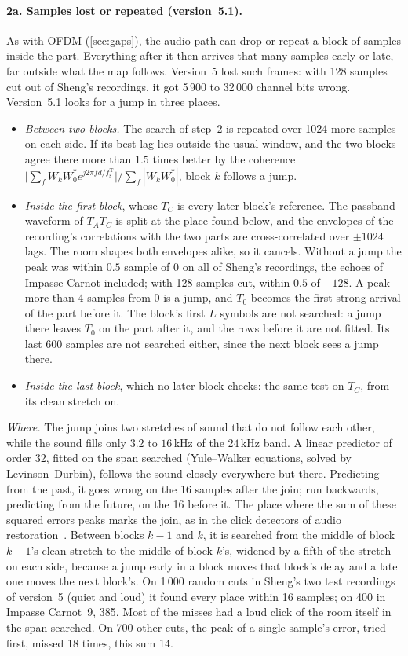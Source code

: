 \documentclass[11pt,a4paper]{article}
\newcommand{\kHz}{\,\mathrm{kHz}}
\newcommand{\fsT}{f_{\mathrm{s}}^{\mathrm{T}}}
\theoremstyle{remark}
\begin{document}
\paragraph{2a. Samples lost or repeated (version~5.1).}
As with OFDM (\cref{sec:gaps}), the audio path can drop or repeat a block of samples inside the part. Everything after it then arrives that many samples early or late, far outside what the map follows. Version~5 lost such frames: with 128 samples cut out of Sheng's recordings, it got 5\,900 to 32\,000 channel bits wrong. Version~5.1 looks for a jump in three places.
\begin{itemize}
\item \emph{Between two blocks.} The search of step~2 is repeated over 1024 more samples on each side. If its best lag lies outside the usual window, and the two blocks agree there more than $1.5$ times better by the coherence $\bigl|\sum_f W_k W_0^* e^{j2\pi f d/\fsT}\bigr| / \sum_f |W_k W_0^*|$, block $k$ follows a jump.
\item \emph{Inside the first block}, whose $T_C$ is every later block's reference. The passband waveform of $T_A T_C$ is split at the place found below, and the envelopes of the recording's correlations with the two parts are cross-correlated over $\pm 1024$ lags. The room shapes both envelopes alike, so it cancels. Without a jump the peak was within $0.5$ sample of 0 on all of Sheng's recordings, the echoes of Impasse Carnot included; with 128 samples cut, within $0.5$ of $-128$. A peak more than 4 samples from 0 is a jump, and $T_0$ becomes the first strong arrival of the part before it. The block's first $L$ symbols are not searched: a jump there leaves $T_0$ on the part after it, and the rows before it are not fitted. Its last 600 samples are not searched either, since the next block sees a jump there.
\item \emph{Inside the last block}, which no later block checks: the same test on $T_C$, from its clean stretch on.
\end{itemize}
\emph{Where.} The jump joins two stretches of sound that do not follow each other, while the sound fills only $3.2$ to $16\kHz$ of the $24\kHz$ band. A linear predictor of order 32, fitted on the span searched (Yule--Walker equations, solved by Levinson--Durbin), follows the sound closely everywhere but there. Predicting from the past, it goes wrong on the 16 samples after the join; run backwards, predicting from the future, on the 16 before it. The place where the sum of these squared errors peaks marks the join, as in the click detectors of audio restoration~\cite{godsill}. Between blocks $k-1$ and $k$, it is searched from the middle of block $k-1$'s clean stretch to the middle of block $k$'s, widened by a fifth of the stretch on each side, because a jump early in a block moves that block's delay and a late one moves the next block's. On 1\,000 random cuts in Sheng's two test recordings of version~5 (quiet and loud) it found every place within 16 samples; on 400 in Impasse Carnot~9, 385. Most of the misses had a loud click of the room itself in the span searched. On 700 other cuts, the peak of a single sample's error, tried first, missed 18 times, this sum 14.
\end{document}
